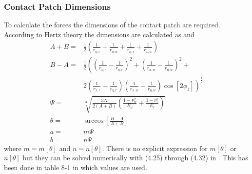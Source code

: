 \subsubsection{Contact Patch Dimensions}
To calculate the forces the dimensions of the contact patch are required.
According to Hertz theory the dimensions are calculated as \cite{hallfasthetslara_bsundstrom} and \cite{railvehicledynamics_eandersson}
\begin{align}
 A+B    =& \frac12 \left(\frac{1}{r_{\eta,r}}+\frac{1}{r_{\eta,w}}+\frac{1}{r_{x,r}}+\frac{1}{r_{x,w}} \right)\\
 \nonumber B-A =& \frac12 \left(\left(\frac{1}{r_{x,r}}-\frac{1}{r_{\eta,r}}\right)^2 + 
                          \left(\frac{1}{r_{x,w}}-\frac{1}{r_{\eta,w}}\right)^2 +\right.\\
               &\left.   2\left(\frac{1}{r_{x,r}}-\frac{1}{r_{\eta,r}}\right)
                          \left(\frac{1}{r_{x,w}}-\frac{1}{r_{\eta,w}}\right)\cos[2\phi_z]\right)^\frac12\\
 \Psi   =& \sqrt[3]{\frac{3 N}{2 (A+B)} \left(\frac{1-\nu_w^2}{E_w} +\frac{1-\nu_r^2}{E_r}\right)}\\ 
 \theta =& \arccos\left[\frac{B-A}{A+B}\right]\\
 a      =& m \Psi\\
 b      =& n \Psi
\end{align}
where $m = m[\theta]$ and $n = n[\theta]$. There is no explicit expression for $m[\theta]$ or $n[\theta]$ but they can be solved numerically with (4.25) through (4.32) in \cite{contact_mechanics_kljohnson}. This has been done in table 8-1 in \cite{railvehicledynamics_eandersson} which values are used.

